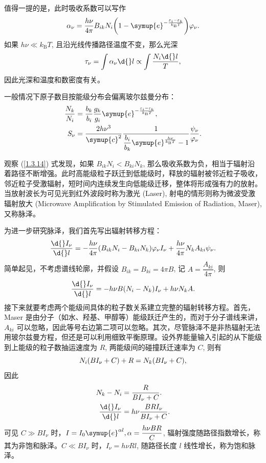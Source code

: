 \documentclass[../天体物理基础.tex]{subfiles}
\begin{document}
值得一提的是，此时吸收系数可以写作
\begin{equation}
\alpha_{\nu}=\frac{h\nu}{4\pi}B_{ik}N_{i}\mleft(1-\symup{e}^{-\frac{\varepsilon_{i}-\varepsilon_{k}}{k_{\mathrm{B}}T}}\mright)\varphi_{\nu}.
\end{equation}
如果 $h\nu\ll{}k_{\mathrm{B}}T$, 且沿光线传播路径温度不变，那么光深
\begin{equation}
\tau_{\nu}=\int\alpha_{\nu}\d{}l\propto\int\frac{N_{i}\d{}l}{T},
\end{equation}
因此光深和温度和数密度有关。

一般情况下原子数目按能级分布会偏离玻尔兹曼分布：
\begin{align}
\frac{N_{k}}{N_{i}}&=\frac{b_{k}}{b_{i}}\frac{g_{k}}{g_{i}}\symup{e}^{-\frac{\varepsilon_{i}-\varepsilon_{k}}{k_{\mathrm{B}}T}},\\
S_{\nu}&=\frac{2h\nu^{3}}{\symup{c}^{2}}\frac{1}{\dfrac{b_{i}}{b_{k}}\symup{e}^{\frac{h\nu}{k_{\mathrm{B}}T}}-1}\frac{\psi_{\nu}}{\varphi_{\nu}}.
\end{align}

观察 (\ref{1.3.14}) 式发现，如果 $B_{ik}N_{i}<B_{ki}N_{k}$, 那么吸收系数为负，相当于辐射沿着路径不断增强。此时高能级粒子跃迁到低能级时，释放的辐射被邻近粒子吸收，邻近粒子受激辐射，短时间内连续发生向低能级迁移，整体将形成强有力的放射。当放射波长为可见光到红外波段时称为激光 (Laser), 射电的情形则称为微波受激辐射放大 (Microwave Amplification by Stimulated Emission of Radiation, Maser), 又称脉泽。

为进一步研究脉泽，我们首先写出辐射转移方程：
\begin{equation}
\frac{\d{}I_{\nu}}{\d{}l}=-\frac{h\nu}{4\pi}\mleft(B_{ik}N_{i}-B_{ki}N_{k}\mright)\varphi_{\nu}I_{\nu}+\frac{h\nu}{4\pi}N_{k}A_{ki}\psi_{\nu}.
\end{equation}
简单起见，不考虑谱线轮廓，并假设 $B_{ik}=B_{ki}=4\pi B$, 记 $A=\dfrac{A_{ki}}{4\pi}$, 则
\begin{equation}
\frac{\d{}I_{\nu}}{\d{}l}=-h\nu B\mleft(N_{i}-N_{k}\mright) I_{\nu}+h\nu N_{k}A.
\end{equation}
接下来就要考虑两个能级间具体的粒子数关系建立完整的辐射转移方程。首先，Maser 是由分子（如水、羟基、甲醇等）能级跃迁产生的，而对于分子谱线来讲，$A_{ki}$ 可以忽略，因此等号右边第二项可以忽略。其次，尽管脉泽不是非热辐射无法用玻尔兹曼方程，但还是可以利用细致平衡原理。设外界能量输入引起的从下能级到上能级的粒子数抽运速度为 $R$, 两能级间的碰撞跃迁速率为 $C$, 则有
\begin{equation}
N_{i}\mleft(BI_{\nu}+C\mright)+R=N_{k}\mleft(BI_{\nu}+C\mright),
\end{equation}
因此
\begin{align}
N_{k}-N_{i}&=\frac{R}{BI_{\nu}+C}.\\
\frac{\d{}I_{\nu}}{\d{}l}&=h\nu \frac{BRI_{\nu}}{BI_{\nu}+C}.
\end{align}
可见 $C\gg BI_{\nu}$ 时，$I=I_{0}\symup{e}^{\alpha l},\alpha=\dfrac{h\nu BR}{C}$, 辐射强度随路径指数增长，称其为非饱和脉泽。$C\ll BI_{\nu}$ 时，$I_{\nu}=h\nu Rl$, 随路径长度 $l$ 线性增长，称为饱和脉泽。
\end{document}
